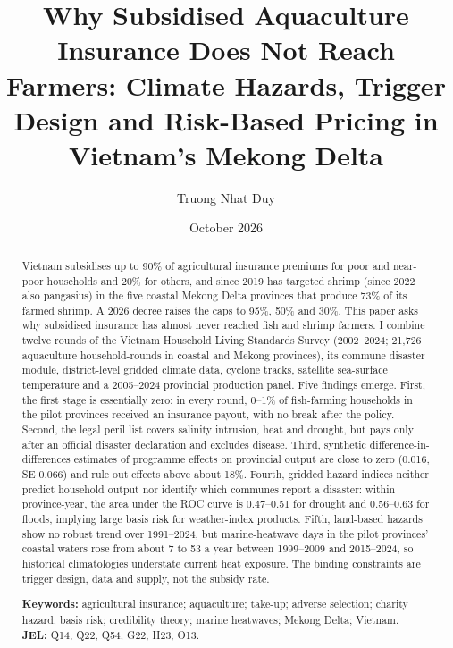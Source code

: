 \documentclass[11pt,a4paper]{article}
\title{\textbf{Why Subsidised Aquaculture Insurance Does Not Reach Farmers: Climate Hazards, Trigger Design and Risk-Based Pricing in Vietnam's Mekong Delta}}
\author{Truong Nhat Duy}
\date{October 2026}
\begin{document}
\maketitle

\begin{abstract}
\noindent Vietnam subsidises up to 90\% of agricultural insurance premiums for poor and near-poor households and 20\% for others, and since 2019 has targeted shrimp (since 2022 also pangasius) in the five coastal Mekong Delta provinces that produce 73\% of its farmed shrimp. A 2026 decree raises the caps to 95\%, 50\% and 30\%. This paper asks why subsidised insurance has almost never reached fish and shrimp farmers. I combine twelve rounds of the Vietnam Household Living Standards Survey (2002--2024; 21,726 aquaculture household-rounds in coastal and Mekong provinces), its commune disaster module, district-level gridded climate data, cyclone tracks, satellite sea-surface temperature and a 2005--2024 provincial production panel. Five findings emerge. First, the first stage is essentially zero: in every round, 0--1\% of fish-farming households in the pilot provinces received an insurance payout, with no break after the policy. Second, the legal peril list covers salinity intrusion, heat and drought, but pays only after an official disaster declaration and excludes disease. Third, synthetic difference-in-differences estimates of programme effects on provincial output are close to zero (0.016, SE 0.066) and rule out effects above about 18\%. Fourth, gridded hazard indices neither predict household output nor identify which communes report a disaster: within province-year, the area under the ROC curve is 0.47--0.51 for drought and 0.56--0.63 for floods, implying large basis risk for weather-index products. Fifth, land-based hazards show no robust trend over 1991--2024, but marine-heatwave days in the pilot provinces' coastal waters rose from about 7 to 53 a year between 1999--2009 and 2015--2024, so historical climatologies understate current heat exposure. The binding constraints are trigger design, data and supply, not the subsidy rate.

\medskip
\noindent\textbf{Keywords:} agricultural insurance; aquaculture; take-up; adverse selection; charity hazard; basis risk; credibility theory; marine heatwaves; Mekong Delta; Vietnam.\\
\noindent\textbf{JEL:} Q14, Q22, Q54, G22, H23, O13.
\end{abstract}

\clearpage
\end{document}
